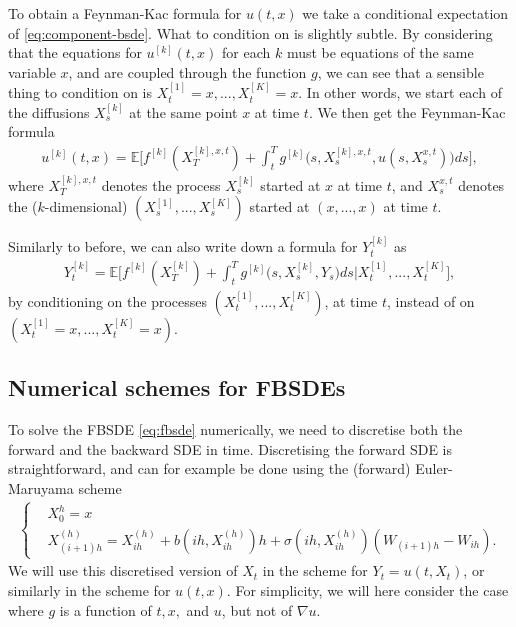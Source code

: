 \documentclass{article}  %
\begin{document}
To obtain a Feynman-Kac formula for $u(t,x)$ we take a conditional expectation of \autoref{eq:component-bsde}. What to condition on is slightly subtle. By considering that the equations for $u^{[k]}(t,x)$ for each $k$ must be equations of the same variable $x$, and are coupled through the function $g$, we can see that a sensible thing to condition on is $X_t^{[1]}=x,...,X_t^{[K]}=x$. In other words, we start each of the diffusions $X^{[k]}_s$ at the same point $x$ at time $t$.
We then get the Feynman-Kac formula
%
\begin{align} 
    u^{[k]}(t,x) = \mathbb{E}\bigg[ f^{[k]}(X_T^{[k],x,t}) + \int_{t}^{T} g^{[k]}\big( s, X_s^{[k],x,t}, u(s,X_s^{x,t}) \big)ds \bigg],
\end{align}
%
where $X_T^{[k],x,t}$ denotes the process $X_s^{[k]}$ started at $x$ at time $t$, and $X_s^{x,t}$ denotes the ($k$-dimensional) $(X_s^{[1]},...,X_s^{[K]})$ started at $(x,...,x)$ at time $t$.

Similarly to before, we can also write down a formula for $Y_t^{[k]}$ as 
%
\begin{align}
Y_t^{[k]} = \mathbb{E}\bigg[ f^{[k]}(X_T^{[k]}) + \int_{t}^{T} g^{[k]}\big( s,X_s^{[k]},Y_s\big)ds \Big\lvert X_t^{[1]},...,X_t^{[K]}\bigg],
\end{align}
%
by conditioning on the processes $(X_t^{[1]},...,X_t^{[K]})$, at time $t$, instead of on $(X_t^{[1]}=x,...,X_t^{[K]}=x)$.

\subsection{Numerical schemes for FBSDEs}

To solve the FBSDE \autoref{eq:fbsde} numerically, we need to discretise both the forward and the backward SDE in time. Discretising the forward SDE is straightforward, and can for example be done using the (forward) Euler-Maruyama scheme
%
\begin{align} 
    \begin{cases}
    &X_0^{h} = x\\
    &X_{(i+1)h}^{(h)} = X_{ih}^{(h)} + b(ih,X_{ih}^{(h)}) h + \sigma(ih,X_{ih}^{(h)})(W_{(i+1)h}-W_{ih}).
    \end{cases}
\end{align}
%
We will use this discretised version of $X_t$ in the scheme for $Y_t=u(t,X_t)$, or similarly in the scheme for $u(t,x)$. For simplicity, we will here consider the case where $g$ is a function of $t,x,$ and $u$, but not of $\nabla u$.
\end{document}
